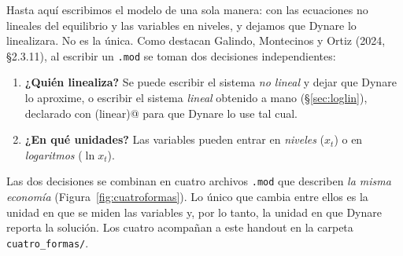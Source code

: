 \documentclass[11pt,a4paper]{report}
\newcommand{\code}[1]{\texttt{#1}}
\begin{document}
Hasta aquí escribimos el modelo de una sola manera: con las ecuaciones no lineales
del equilibrio y las variables en niveles, y dejamos que Dynare lo linealizara. No es
la única. Como destacan Galindo, Montecinos y Ortiz (2024, \S2.3.11), al escribir un
\code{.mod} se toman dos decisiones independientes:
\begin{enumerate}[label=(\roman*),nosep,leftmargin=2.2em]
\item \textbf{¿Quién linealiza?} Se puede escribir el sistema \emph{no lineal} y
  dejar que Dynare lo aproxime, o escribir el sistema \emph{lineal} obtenido a mano
  (\S\ref{sec:loglin}), declarado con \mbox{\lstinline@model(linear)@} para que Dynare
  lo use tal cual.
\item \textbf{¿En qué unidades?} Las variables pueden entrar en \emph{niveles}
  ($x_t$) o en \emph{logaritmos} ($\ln x_t$).
\end{enumerate}
Las dos decisiones se combinan en cuatro archivos \code{.mod} que describen
\emph{la misma economía} (Figura~\ref{fig:cuatroformas}). Lo único que cambia entre
ellos es la unidad en que se miden las variables y, por lo tanto, la unidad en que
Dynare reporta la solución. Los cuatro acompañan a este handout en la carpeta
\code{cuatro\_formas/}.
\end{document}
